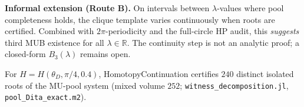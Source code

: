 \textbf{Informal extension (Route B).}
On intervals between $\lambda$-values where pool completeness holds, the clique template varies continuously when roots are certified.
Combined with $2\pi$-periodicity and the full-circle HP audit, this \emph{suggests} third MUB existence for all $\lambda\in\mathbb{R}$.
The continuity step is not an analytic proof; a closed-form $B_3(\lambda)$ remains open.

\begin{finding}
\label{lem:L7}
For $H=H(\theta_D,\pi/4,0.4)$, HomotopyContinuation certifies $240$ distinct isolated roots of the MU-pool system
(mixed volume $252$; \texttt{witness\_decomposition.jl}, \texttt{pool\_Dita\_exact.m2}).
\end{finding}
